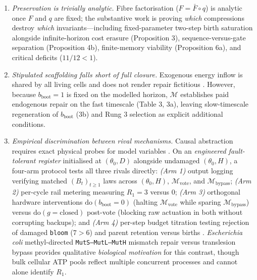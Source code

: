 \documentclass[12pt,letterpaper]{article}
\begin{document}
\begin{enumerate}
  \citep{mayo2018}.
\item
  \emph{Preservation is trivially analytic.} Fibre factorisation
  (\(F = \bar{F}\circ q\)) is analytic once \(F\) and \(q\) are fixed;
  the substantive work is proving \emph{which} compressions destroy
  \emph{which} invariants---including fixed-parameter two-step birth
  saturation alongside infinite-horizon cost erasure (Proposition 3),
  sequence-versus-gate separation (Proposition 4b), finite-memory
  viability (Proposition 6a), and critical deficits (\(11/12 < 1\)).
\item
  \emph{Stipulated scaffolding falls short of full closure.} Exogenous
  energy inflow is shared by all living cells and does not render repair
  fictitious \citep{jonas1966, montevilMossio2015}. However, because
  \(b_{\mathrm{boot}}=1\) is fixed on the modelled horizon,
  \(\mathcal{M}\) establishes paid endogenous repair on the fast
  timescale (Table 3, 3a), leaving slow-timescale regeneration of
  \(b_{\mathrm{boot}}\) (3b) and Rung 3 selection as explicit additional
  conditions.
\item
  \emph{Empirical discrimination between rival mechanisms.} Causal
  abstraction requires exact physical probes for model variables
  \citep{craver2007, rubenstein2017}. On an \emph{engineered
  fault-tolerant register} initialised at \((\theta_0, D)\) alongside
  undamaged \((\theta_0, H)\), a four-arm protocol tests all three
  rivals directly: \emph{(Arm 1)} output logging verifying matched
  \((B_t)_{t\ge 1}\) laws across \((\theta_0, H)\),
  \(\mathcal{M}_{\mathrm{vote}}\), and
  \(\mathcal{M}_{\mathrm{bypass}}\); \emph{(Arm 2)} per-cycle rail
  metering measuring \(R_1 = 3\) versus \(0\); \emph{(Arm 3)} orthogonal
  hardware interventions \(\mathrm{do}(b_{\mathrm{boot}}=0)\) (halting
  \(\mathcal{M}_{\mathrm{vote}}\) while sparing
  \(\mathcal{M}_{\mathrm{bypass}}\)) versus
  \(\mathrm{do}(g=\mathrm{closed})\) post-vote (blocking raw actuation
  in both without corrupting backups); and \emph{(Arm 4)} per-step
  budget titration testing rejection of damaged \texttt{bloom}
  (\(7 > 6\)) and parent retention versus births \citep{mayo2018}.
  \emph{Escherichia coli} methyl-directed \texttt{MutS--MutL--MutH}
  mismatch repair versus translesion bypass
  \citep{auWelshModrich1992, hasanLeach2015} provides qualitative
  \emph{biological motivation} for this contrast, though bulk cellular
  ATP pools reflect multiple concurrent processes and cannot alone
  identify \(R_1\).
\end{enumerate}
\end{document}
